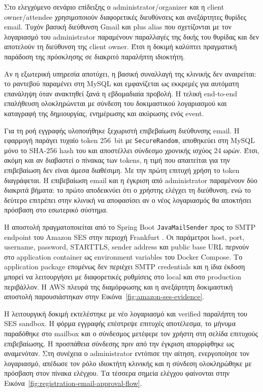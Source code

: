 Στο ελεγχόμενο σενάριο επίδειξης ο administrator/organizer και η client
owner/attendee χρησιμοποιούν διαφορετικές διευθύνσεις και ανεξάρτητες
θυρίδες email. Τυχόν βασική διεύθυνση Gmail και plus alias που σχετίζονται
με τον λογαριασμό του administrator παραμένουν παραλλαγές της δικής του
θυρίδας και δεν αποτελούν τη διεύθυνση της client owner. Έτσι η δοκιμή
καλύπτει πραγματική παράδοση της πρόσκλησης σε διακριτό παραλήπτη ιδιοκτήτη.

Αν η εξωτερική υπηρεσία αποτύχει, η βασική συναλλαγή της κλινικής δεν
αναιρείται: το ραντεβού παραμένει στη MySQL και εμφανίζεται ως εκκρεμές για
αυτόματη επανάληψη όταν ανακτηθεί ξανά η εβδομαδιαία προβολή. Η τελική
end-to-end επαλήθευση ολοκληρώνεται με σύνδεση του δοκιμαστικού λογαριασμού
και καταγραφή της δημιουργίας, ενημέρωσης και ακύρωσης ενός event.

Για τη ροή εγγραφής υλοποιήθηκε ξεχωριστή επιβεβαίωση διεύθυνσης email. Η
εφαρμογή παράγει τυχαίο token 256~bit με \texttt{SecureRandom}, αποθηκεύει στη
MySQL μόνο το SHA-256 hash του και αποστέλλει σύνδεσμο χρονικής ισχύος 24
ωρών. Έτσι, ακόμη και αν διαβαστεί ο πίνακας των tokens, η τιμή που απαιτείται
για την επιβεβαίωση δεν είναι άμεσα διαθέσιμη. Με την πρώτη επιτυχή χρήση το
token διαγράφεται. Η επιβεβαίωση email και η έγκριση από administrator
παραμένουν δύο διακριτά βήματα: το πρώτο αποδεικνύει ότι ο χρήστης ελέγχει τη
διεύθυνση, ενώ το δεύτερο επιτρέπει στην κλινική να αποφασίσει αν ο νέος
λογαριασμός θα αποκτήσει πρόσβαση στο εσωτερικό σύστημα.

Η αποστολή πραγματοποιείται από το Spring Boot \texttt{JavaMailSender} προς
το SMTP endpoint του Amazon SES στην περιοχή Frankfurt
\cite{rfc5321,aws2026sessmtp}. Οι παράμετροι host,
port, username, password, STARTTLS, sender address και public base URL
περνούν στο application container ως environment variables του Docker
Compose. Το application package επομένως δεν περιέχει SMTP credentials και
η ίδια έκδοση μπορεί να λειτουργήσει με διαφορετικές ρυθμίσεις στο local και
στο production περιβάλλον. Η AWS πλευρά της διαμόρφωσης και η ανεξάρτητη
δοκιμαστική αποστολή παρουσιάστηκαν στην
Εικόνα~\ref{fig:amazon-ses-evidence}.

Η λειτουργική δοκιμή εκτελέστηκε με νέο λογαριασμό και verified παραλήπτη του
SES sandbox. Η φόρμα εγγραφής επέστρεψε επιτυχές αποτέλεσμα, το μήνυμα
παραδόθηκε στο mailbox και ο σύνδεσμος μετέφερε τον χρήστη στη σελίδα
επιτυχούς επιβεβαίωσης. Η προσπάθεια σύνδεσης πριν από την έγκριση απορρίφθηκε
ως αναμενόταν. Στη συνέχεια ο administrator εντόπισε την αίτηση, ενεργοποίησε
τον λογαριασμό, απέδωσε τον ρόλο ιδιοκτήτη κλινικής και η σύνδεση ολοκληρώθηκε
με πρόσβαση στον πίνακα ελέγχου. Τα τέσσερα σημεία ελέγχου φαίνονται στην
Εικόνα~\ref{fig:registration-email-approval-flow}.

